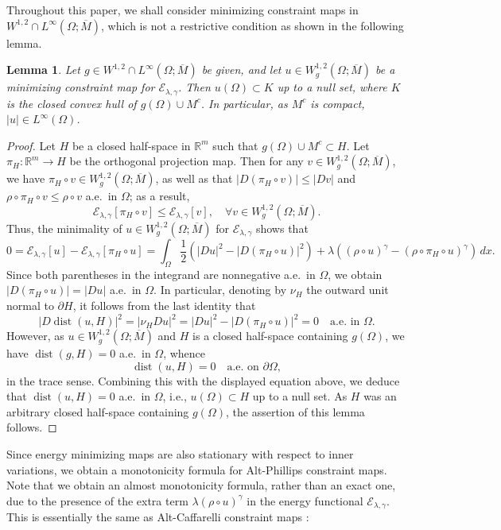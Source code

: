 \documentclass[11pt]{amsart}
\newcommand{\R}{{\mathbb R}}
\newcommand{\cE}{{\mathcal E}}
\newcommand{\dist}{\operatorname{dist}}
\theoremstyle{plain}
\newtheorem{lem}[thm]{Lemma}
\theoremstyle{definition}
\theoremstyle{remark}
\numberwithin{equation}{section}
\begin{document}
Throughout this paper, we shall consider minimizing constraint maps in $ W^{1,2}\cap L^\infty (\Omega;\overline M)$, which is not a restrictive condition as shown in the following lemma.



\begin{lem}\label{lem:bdd}
    Let $g\in W^{1,2}\cap L^\infty (\Omega;\overline M)$ be given, and let $u\in W_g^{1,2}(\Omega;\overline M)$ be a minimizing constraint map for $\cE_{\lambda,\gamma}$. Then $u(\Omega) \subset K$ up to a null set, where $K$ is the closed convex hull of $g(\Omega)\cup M^c$. In particular, as $M^c$ is compact, $|u|\in L^\infty(\Omega)$.
\end{lem}

\begin{proof}
Let $H$ be a closed half-space in $\R^m$ such that $g(\Omega)\cup M^c\subset H$. Let $\pi_H : \R^m\to H$ be the orthogonal projection map. Then for any $v\in W_g^{1,2}(\Omega;\overline M)$, we have $\pi_H\circ v \in W_g^{1,2}(\Omega;\overline M)$, as well as that $|D(\pi_H\circ v)|\leq |Dv|$ and $\rho\circ \pi_H\circ v\leq \rho\circ v$ a.e.\ in $\Omega$; as a result,  
$$
\cE_{\lambda,\gamma}[\pi_H\circ v]\leq \cE_{\lambda,\gamma}[v],\quad\forall v\in W_g^{1,2}(\Omega;\overline M).
$$
Thus, the minimality of $u\in W_g^{1,2}(\Omega;\overline M)$ for $\cE_{\lambda,\gamma}$ shows that 
$$
0 = \cE_{\lambda,\gamma}[u] - \cE_{\lambda,\gamma}[\pi_H\circ u] = \int_\Omega \frac{1}{2}(|Du|^2 - |D(\pi_H\circ u)|^2) + {\lambda}((\rho\circ u)^\gamma -(\rho\circ \pi_H\circ u)^\gamma) \,dx.
$$
Since both parentheses in the integrand are nonnegative a.e.\ in $\Omega$, we obtain $|D(\pi_H\circ u)| = |Du|$ a.e.\ in $\Omega$. In particular, denoting by $\nu_H$ the outward unit normal to $\partial H$, it follows from the last identity that 
$$
|D\dist(u, H)|^2 = |\nu_H Du|^2 = |Du|^2 - |D(\pi_H\circ u)|^2 = 0 \quad\text{a.e.\ in }\Omega. 
$$
However, as $u\in W_g^{1,2}(\Omega;\overline M)$ and $H$ is a closed half-space containing $g(\Omega)$, we have $\dist(g,H) = 0$ a.e.\ in $\Omega$, whence 
$$
\dist(u,H) = 0\quad\text{a.e.\ on }\partial\Omega,
$$
in the trace sense. Combining this with the displayed equation above, we deduce that $\dist(u,H) = 0$ a.e.\ in $\Omega$, i.e., $u(\Omega)\subset H$ up to a null set. As $H$ was an arbitrary closed half-space containing $g(\Omega)$, the assertion of this lemma follows. 
\end{proof}

Since energy minimizing maps are also stationary with respect to inner variations, we obtain a monotonicity formula for Alt-Phillips constraint maps. Note that we obtain an almost monotonicity formula, rather than an exact one, due to the presence of the extra term $\lambda(\rho\circ u)^\gamma$ in the energy functional $\cE_{\lambda,\gamma}$. This is essentially the same as Alt-Caffarelli constraint maps \cite{FGKS1}: 
\end{document}
